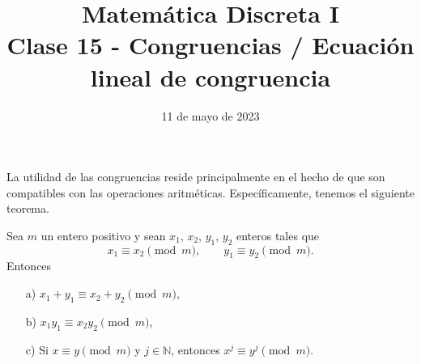 \documentclass{beamer}
\title[Clase 15 - Congruencia ]{Matemática Discreta I \\ Clase 15 - Congruencias / Ecuación lineal de congruencia}
\institute[]{\normalsize FAMAF / UNC
    \\[\baselineskip] ${}^{}$
    \\[\baselineskip]
}
\date[11/05/2023]{11 de mayo de 2023}
\begin{document}
    
    \frame{\titlepage} 
    
    
    \begin{frame}
        La utilidad de las congruencias reside principalmente en el hecho
        de que son compatibles con las operaciones aritméticas. \pause
        Específicamente, tenemos el siguiente teorema.
        
        \begin{teorema}\label{t4.1} Sea $m$ un entero positivo y sean $x_1$, $x_2$,
            $y_1$, $y_2$ enteros tales que
            $$
            x_1 \equiv x_2 \pmod{m}, \qquad y_1 \equiv y_2 \pmod{m}.
            $$
            Entonces
            \begin{enumerate}
                \item[a)] $ x_1+ y_1 \equiv x_2+ y_2 \pmod{m}$,
                \item[b)] $x_1 y_1 \equiv x_2 y_2 \pmod{m}$,
                \item[c)] Si $x \equiv y \pmod{m}$  y $j \in  \mathbb N$, entonces $x^j \equiv y^j \pmod{m}$.
            \end{enumerate}
        \end{teorema}
        
    \end{frame}
    
    
    
\end{document}
